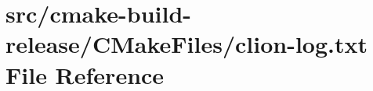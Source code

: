 \hypertarget{cmake-build-release_2CMakeFiles_2clion-log_8txt}{}\section{src/cmake-\/build-\/release/\+C\+Make\+Files/clion-\/log.txt File Reference}
\label{cmake-build-release_2CMakeFiles_2clion-log_8txt}
